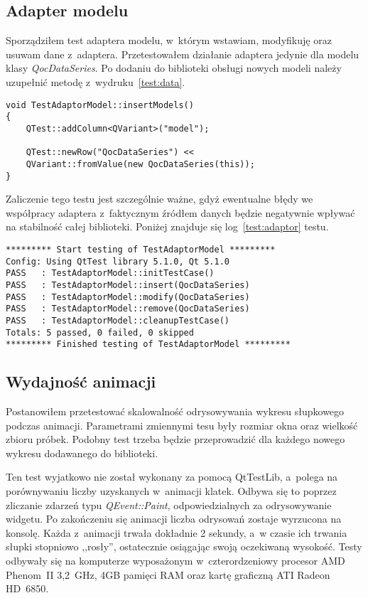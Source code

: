 \subsection{Adapter modelu}
Sporządziłem test adaptera modelu, w~którym wstawiam, modyfikuję oraz usuwam dane z~adaptera. Przetestowałem działanie adaptera jedynie dla modelu klasy \textit{QocDataSeries}. Po dodaniu do biblioteki obsługi nowych modeli należy uzupełnić metodę z~wydruku~\ref{test:data}.

\begin{lstlisting}[caption=Dane sterujące testami, label=test:data]
void TestAdaptorModel::insertModels()
{
	QTest::addColumn<QVariant>("model");

	QTest::newRow("QocDataSeries") << 
	QVariant::fromValue(new QocDataSeries(this));
}
\end{lstlisting}

Zaliczenie tego testu jest szczególnie ważne, gdyż ewentualne błędy we współpracy adaptera z~faktycznym źródłem danych będzie negatywnie wpływać na stabilność całej biblioteki. Poniżej znajduje się log~\ref{test:adaptor} testu.

\begin{lstlisting}[caption=Test adptera modelu, label=test:adaptor]
********* Start testing of TestAdaptorModel *********
Config: Using QtTest library 5.1.0, Qt 5.1.0
PASS   : TestAdaptorModel::initTestCase()
PASS   : TestAdaptorModel::insert(QocDataSeries)
PASS   : TestAdaptorModel::modify(QocDataSeries)
PASS   : TestAdaptorModel::remove(QocDataSeries)
PASS   : TestAdaptorModel::cleanupTestCase()
Totals: 5 passed, 0 failed, 0 skipped
********* Finished testing of TestAdaptorModel *********
\end{lstlisting}

\subsection{Wydajność animacji}
Postanowiłem przetestować skalowalność odrysowywania wykresu słupkowego podczas animacji. Parametrami zmiennymi tesu były rozmiar okna oraz wielkość zbioru próbek. Podobny test trzeba będzie przeprowadzić dla każdego nowego wykresu dodawanego do biblioteki.

Ten test wyjatkowo nie został wykonany za pomocą QtTestLib, a~polega na porównywaniu liczby uzyskanych w~animacji klatek. Odbywa się to poprzez zliczanie zdarzeń typu \textit{QEvent::Paint}, odpowiedzialnych za odrysowywanie widgetu. Po zakończeniu się animacji liczba odrysowań zostaje wyrzucona na konsolę. Każda z~animacji trwała dokładnie 2 sekundy, a~w czasie ich trwania słupki stopniowo ,,rosły'', ostatecznie osiągając swoją oczekiwaną wysokość. Testy odbywały się na komputerze wyposażonym w~czterordzeniowy procesor AMD Phenom~II 3,2~GHz, 4GB pamięci RAM oraz kartę graficzną ATI Radeon HD~6850.

